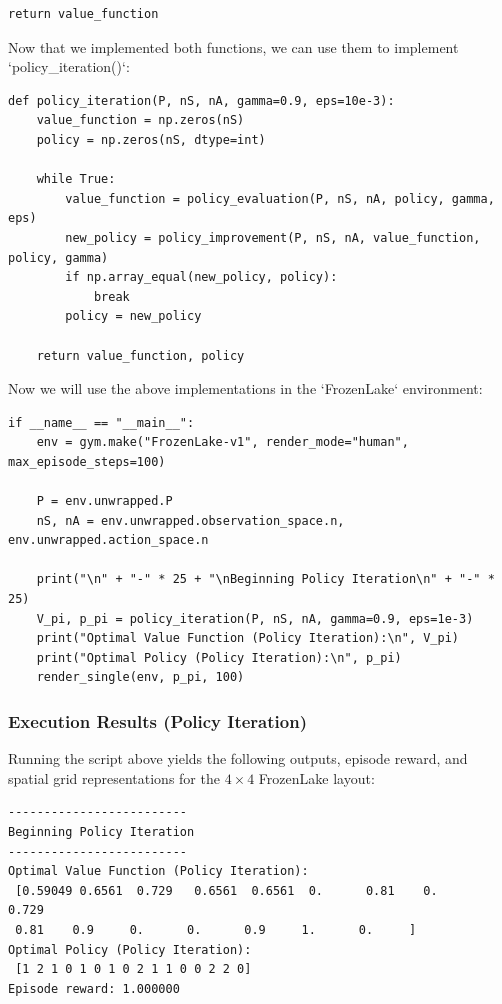 \documentclass{article}
\begin{document}
\begin{enumerate}
\begin{enumerate}
\begin{lstlisting}[caption={implementation of  `policy\_evaluation()`},label={lst:beat}]
    return value_function
    \end{lstlisting}
    \end{enumerate}

    Now that we implemented both functions, we can use them to implement `policy\_iteration()`:

    \begin{lstlisting}[caption={implementation of  `policy\_iteration()`},label={lst:beat}]
def policy_iteration(P, nS, nA, gamma=0.9, eps=10e-3):
    value_function = np.zeros(nS)
    policy = np.zeros(nS, dtype=int)

    while True:
        value_function = policy_evaluation(P, nS, nA, policy, gamma, eps)
        new_policy = policy_improvement(P, nS, nA, value_function, policy, gamma)
        if np.array_equal(new_policy, policy):
            break
        policy = new_policy

    return value_function, policy
    \end{lstlisting}

    Now we will use the above implementations in the `FrozenLake` environment:

    \begin{lstlisting}[caption={Execution script for FrozenLake using Policy Iteration},label={lst:main_exec}]
if __name__ == "__main__":
    env = gym.make("FrozenLake-v1", render_mode="human", max_episode_steps=100)

    P = env.unwrapped.P
    nS, nA = env.unwrapped.observation_space.n, env.unwrapped.action_space.n

    print("\n" + "-" * 25 + "\nBeginning Policy Iteration\n" + "-" * 25)
    V_pi, p_pi = policy_iteration(P, nS, nA, gamma=0.9, eps=1e-3)
    print("Optimal Value Function (Policy Iteration):\n", V_pi)
    print("Optimal Policy (Policy Iteration):\n", p_pi)
    render_single(env, p_pi, 100)
    \end{lstlisting}

    \subsubsection*{Execution Results (Policy Iteration)}
    Running the script above yields the following outputs, episode reward, and spatial grid representations for the $4 \times 4$ FrozenLake layout:

    \begin{verbatim}
-------------------------
Beginning Policy Iteration
-------------------------
Optimal Value Function (Policy Iteration):
 [0.59049 0.6561  0.729   0.6561  0.6561  0.      0.81    0.      0.729
 0.81    0.9     0.      0.      0.9     1.      0.     ]
Optimal Policy (Policy Iteration):
 [1 2 1 0 1 0 1 0 2 1 1 0 0 2 2 0]
Episode reward: 1.000000
    \end{verbatim}


\end{enumerate}
\end{document}
